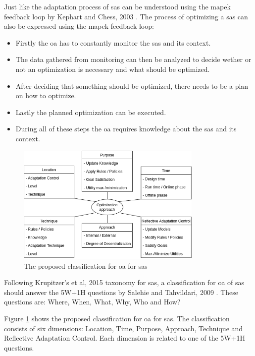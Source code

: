 \noindent Just like the adaptation process of \acrshort{sas} can be understood using
the \acrshort{mapek} feedback loop by Kephart and Chess, 2003 \cite*{VisionOfAutonomicComputing}.
The process of optimizing a \acrshort{sas} can also be expressed using the \acrshort{mapek} feedback loop:
\begin{itemize}[nosep]
    \item Firstly the \acrshort{oa} has to constantly monitor the \acrshort{sas} and its context.
    \item The data gathered from monitoring can then be analyzed to decide wether or not an optimization is necessary and what should be optimized.
    \item After deciding that something should be optimized, there needs to be a plan on how to optimize.
    \item Lastly the planned optimization can be executed.
    \item During all of these steps the \acrshort{oa} requires knowledge about the \acrshort{sas} and its context.
\end{itemize}

\begin{figure}[h]
    \centering
    \includegraphics[width=0.8\textwidth]{images/ClassificationProposal-WithDimensions.png}
    \caption{The proposed classification for \acrshort{oa} for \acrshort{sas}}
    \label{fig:Proposal}
\end{figure}

\noindent Following Krupitzer's et al, 2015 \cite*{SurveyOnEngineeringApproaches} taxonomy for \acrshort{sas},
a classification for \acrshort{oa} of \acrshort{sas} should answer 
the 5W+1H questions by Salehie and Tahvildari, 2009 \cite*{LandscapeAndResearchChallenges}.
These questions are: Where, When, What, Why, Who and How?

\noindent Figure \ref{fig:Proposal} shows the proposed classification for \acrshort{oa} for \acrshort{sas}.
The classification consists of six dimensions: Location, Time, Purpose, Approach, Technique and Reflective Adaptation Control.
Each dimension is related to one of the 5W+1H questions.


